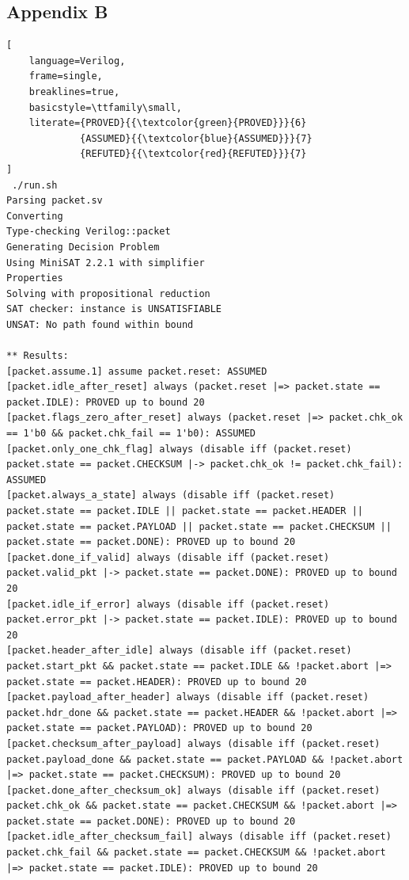 \documentclass{article}
\begin{document}
\subsection{Appendix B} \label{sec:appb}
\begin{lstlisting}[
    language=Verilog,
    frame=single,
    breaklines=true,
    basicstyle=\ttfamily\small,
    literate={PROVED}{{\textcolor{green}{PROVED}}}{6}
             {ASSUMED}{{\textcolor{blue}{ASSUMED}}}{7}
             {REFUTED}{{\textcolor{red}{REFUTED}}}{7}
]
 ./run.sh 
Parsing packet.sv
Converting
Type-checking Verilog::packet
Generating Decision Problem
Using MiniSAT 2.2.1 with simplifier
Properties
Solving with propositional reduction
SAT checker: instance is UNSATISFIABLE
UNSAT: No path found within bound
 
** Results:
[packet.assume.1] assume packet.reset: ASSUMED
[packet.idle_after_reset] always (packet.reset |=> packet.state == packet.IDLE): PROVED up to bound 20
[packet.flags_zero_after_reset] always (packet.reset |=> packet.chk_ok == 1'b0 && packet.chk_fail == 1'b0): ASSUMED
[packet.only_one_chk_flag] always (disable iff (packet.reset) packet.state == packet.CHECKSUM |-> packet.chk_ok != packet.chk_fail): ASSUMED
[packet.always_a_state] always (disable iff (packet.reset) packet.state == packet.IDLE || packet.state == packet.HEADER || packet.state == packet.PAYLOAD || packet.state == packet.CHECKSUM || packet.state == packet.DONE): PROVED up to bound 20
[packet.done_if_valid] always (disable iff (packet.reset) packet.valid_pkt |-> packet.state == packet.DONE): PROVED up to bound 20
[packet.idle_if_error] always (disable iff (packet.reset) packet.error_pkt |-> packet.state == packet.IDLE): PROVED up to bound 20
[packet.header_after_idle] always (disable iff (packet.reset) packet.start_pkt && packet.state == packet.IDLE && !packet.abort |=> packet.state == packet.HEADER): PROVED up to bound 20
[packet.payload_after_header] always (disable iff (packet.reset) packet.hdr_done && packet.state == packet.HEADER && !packet.abort |=> packet.state == packet.PAYLOAD): PROVED up to bound 20
[packet.checksum_after_payload] always (disable iff (packet.reset) packet.payload_done && packet.state == packet.PAYLOAD && !packet.abort |=> packet.state == packet.CHECKSUM): PROVED up to bound 20
[packet.done_after_checksum_ok] always (disable iff (packet.reset) packet.chk_ok && packet.state == packet.CHECKSUM && !packet.abort |=> packet.state == packet.DONE): PROVED up to bound 20
[packet.idle_after_checksum_fail] always (disable iff (packet.reset) packet.chk_fail && packet.state == packet.CHECKSUM && !packet.abort |=> packet.state == packet.IDLE): PROVED up to bound 20

\end{lstlisting}
\end{document}
